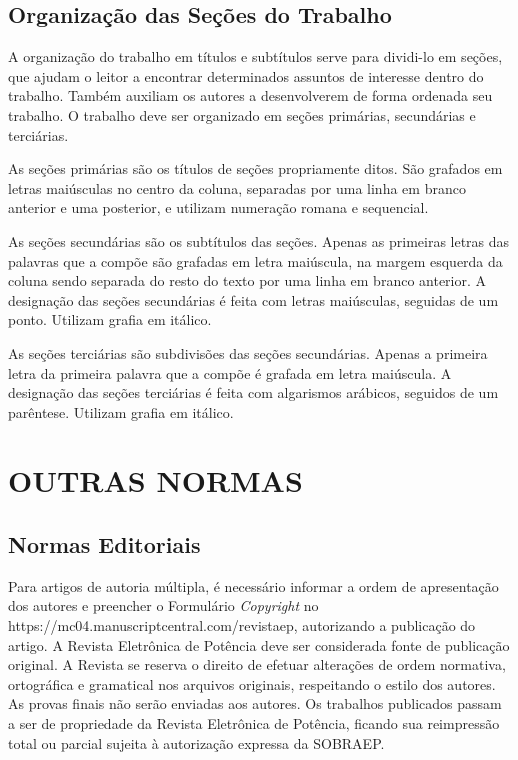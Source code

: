 \documentclass[portugues]{sobraep}
\begin{document}
\subsection{Organização das Seções do Trabalho}

A organização do trabalho em títulos e subtítulos serve para dividi-lo em seções, que ajudam o leitor a encontrar determinados assuntos de interesse dentro do trabalho. Também auxiliam os autores a desenvolverem de forma ordenada seu trabalho. O trabalho deve ser organizado em seções primárias, secundárias e terciárias.

As seções primárias são os títulos de seções propriamente ditos. São grafados em letras maiúsculas no centro da coluna, separadas por uma linha em branco anterior e uma posterior, e utilizam numeração romana e sequencial.

As seções secundárias são os subtítulos das seções. Apenas as primeiras letras das palavras que a compõe são grafadas em letra maiúscula, na margem esquerda da coluna sendo separada do resto do texto por uma linha em branco anterior. A designação das seções secundárias é feita com letras maiúsculas, seguidas de um ponto. Utilizam grafia em itálico.

As seções terciárias são subdivisões das seções secundárias. Apenas a primeira letra da primeira palavra que a compõe é grafada em letra maiúscula. A designação das seções terciárias é feita com algarismos arábicos, seguidos de um parêntese. Utilizam grafia em itálico.


\section{OUTRAS NORMAS}

\subsection{Normas Editoriais}

Para artigos de autoria múltipla, é necessário informar a ordem de apresentação dos autores e preencher o Formulário \textit{Copyright} no https://mc04.manuscriptcentral.com/revistaep, autorizando a publicação do artigo. A Revista Eletrônica de Potência deve ser considerada fonte de publicação original. A Revista se reserva o direito de efetuar alterações de ordem normativa, ortográfica e gramatical nos arquivos originais, respeitando o estilo dos autores. As provas finais não serão enviadas aos autores. Os trabalhos publicados passam a ser de propriedade da Revista Eletrônica de Potência, ficando sua reimpressão total ou parcial sujeita à autorização expressa da SOBRAEP.
\end{document}
